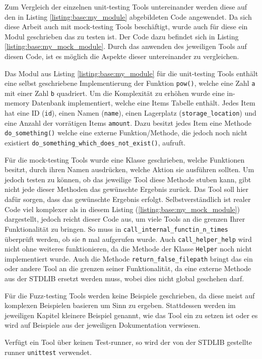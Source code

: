 Zum Vergleich der einzelnen unit-testing Tools untereinander werden diese auf
den in Listing \ref{listing:base:my_module} abgebildeten Code angewendet. Da
sich diese Arbeit auch mit \gls{mock}-testing Tools beschäftigt, wurde auch für
diese ein Modul geschrieben das zu testen ist.
Der Code dazu befindet sich in Listing \ref{listing:base:my_mock_module}. Durch
das anwenden des jeweiligen Tools auf diesen Code, ist es möglich die Aspekte
dieser untereinander zu vergleichen.

Das Modul aus Listing \ref{listing:base:my_module} für die unit-testing Tools
enthält eine selbst geschriebene Implementierung der Funktion \lstinline|pow()|,
welche eine Zahl \lstinline|a| mit einer Zahl \lstinline|b| quadriert. Um die
Komplexität zu erhöhen wurde eine in-memory Datenbank implementiert, welche
eine Items Tabelle enthält. Jedes Item hat eine ID (\lstinline|id|), einen Namen
(\lstinline|name|), einen Lagerplatz (\lstinline|storage_location|) und eine
Anzahl der vorrätigen Items \lstinline|amount|. Dazu besitzt jedes Item eine
Methode \lstinline|do_something()| welche eine externe Funktion/Methode,
die jedoch noch nicht existiert \lstinline|do_something_which_does_not_exist()|,
aufruft.

Für die \gls{mock}-testing Tools wurde eine Klasse geschrieben, welche 
Funktionen besitzt, durch ihren Namen ausdrücken, welche Aktion sie ausführen 
sollten.
Um jedoch testen zu können, ob das jeweilige Tool diese Methode \gls{stub}en
kann, gibt nicht jede dieser Methoden das gewünschte Ergebnis zurück. Das Tool 
soll hier dafür sorgen, dass das gewünschte Ergebnis erfolgt.
Selbstverständlich ist realer Code viel komplexer als in diesem Listing
(\ref{listing:base:my_mock_module}) dargestellt, jedoch reicht dieser Code aus,
um viele Tools an die grenzen Ihrer Funktionalität zu bringen. So muss in
\lstinline{call_internal_functin_n_times} überprüft werden, ob sie \lstinline{n}
mal aufgerufen wurde. Auch \lstinline{call_helper_help} wird nicht ohne 
weiteres funktionieren, da die Methode der Klasse \lstinline{Helper} noch nicht 
implementiert wurde. Auch die Methode \lstinline{return_false_filepath}
bringt das ein oder andere Tool an die grenzen seiner Funktionalität, da eine 
externe Methode aus der STDLIB ersetzt werden muss, wobei dies nicht global 
geschehen darf.

Für die Fuzz-testing Tools werden keine Beispiele geschrieben, da diese meist 
auf komplexen Beispielen basieren um Sinn zu ergeben. Stattdessen werden im 
jeweiligen Kapitel kleinere Beispiel
genannt, wie das Tool ein zu setzen ist oder es wird auf Beispiele aus der jeweiligen Dokumentation
verwiesen.

Verfügt ein Tool über keinen Test-runner, so wird der von der STDLIB gestellte 
runner \lstinline{unittest} verwendet.







